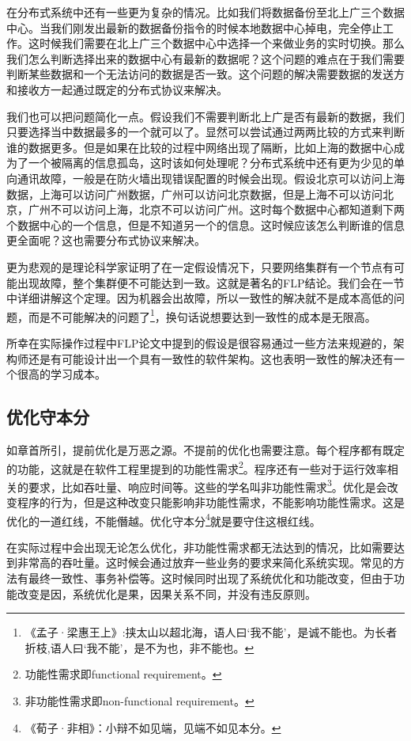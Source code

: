 在分布式系统中还有一些更为复杂的情况。比如我们将数据备份至北上广三个数据中心。当我们刚发出最新的数据备份指令的时候本地数据中心掉电，完全停止工作。这时候我们需要在北上广三个数据中心中选择一个来做业务的实时切换。那么我们怎么判断选择出来的数据中心有最新的数据呢？这个问题的难点在于我们需要判断某些数据和一个无法访问的数据是否一致。这个问题的解决需要数据的发送方和接收方一起通过既定的分布式协议来解决。

我们也可以把问题简化一点。假设我们不需要判断北上广是否有最新的数据，我们只要选择当中数据最多的一个就可以了。显然可以尝试通过两两比较的方式来判断谁的数据更多。但是如果在比较的过程中网络出现了隔断，比如上海的数据中心成为了一个被隔离的信息孤岛，这时该如何处理呢？分布式系统中还有更为少见的单向通讯故障，一般是在防火墙出现错误配置的时候会出现。假设北京可以访问上海数据，上海可以访问广州数据，广州可以访问北京数据，但是上海不可以访问北京，广州不可以访问上海，北京不可以访问广州。这时每个数据中心都知道剩下两个数据中心的一个信息，但是不知道另一个的信息。这时候应该怎么判断谁的信息更全面呢？这也需要分布式协议来解决。

更为悲观的是理论科学家证明了在一定假设情况下，只要网络集群有一个节点有可能出现故障，整个集群便不可能达到一致。这就是著名的FLP结论\cite{Fischer1985}。我们会在一节中详细讲解这个定理。因为机器会出故障，所以一致性的解决就不是成本高低的问题，而是不可能解决的问题了\footnote{《孟子·梁惠王上》:挟太山以超北海，语人曰‘我不能’，是诚不能也。为长者折枝,语人曰‘我不能’，是不为也，非不能也。}，换句话说想要达到一致性的成本是无限高。


所幸在实际操作过程中FLP论文中提到的假设是很容易通过一些方法来规避的，架构师还是有可能设计出一个具有一致性的软件架构。这也表明一致性的解决还有一个很高的学习成本。




\subsection{优化守本分}

如章首所引，提前优化是万恶之源。不提前的优化也需要注意。每个程序都有既定的功能，这就是在软件工程里提到的功能性需求\footnote{功能性需求即functional requirement。}。程序还有一些对于运行效率相关的要求，比如吞吐量、响应时间等。这些的学名叫非功能性需求\footnote{非功能性需求即non-functional requirement。}。优化是会改变程序的行为，但是这种改变只能影响非功能性需求，不能影响功能性需求。这是优化的一道红线，不能僭越。优化守本分\footnote{《荀子·非相》：小辩不如见端，见端不如见本分。}就是要守住这根红线。


在实际过程中会出现无论怎么优化，非功能性需求都无法达到的情况，比如需要达到非常高的吞吐量。这时候会通过放弃一些业务的要求来简化系统实现。常见的方法有最终一致性、事务补偿等。这时候同时出现了系统优化和功能改变，但由于功能改变是因，系统优化是果，因果关系不同，并没有违反原则。



